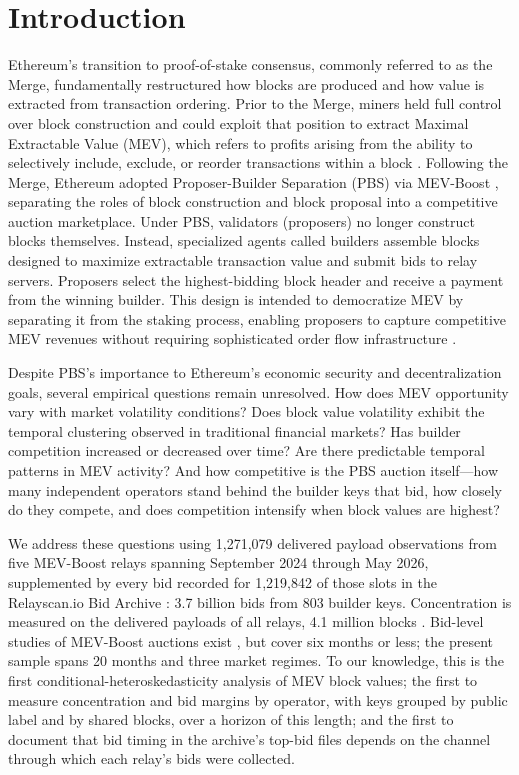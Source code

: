 \documentclass[11pt]{article}
\begin{document}
\newpage
\tableofcontents
\newpage

\section{Introduction}
\label{sec:intro}

Ethereum's transition to proof-of-stake consensus, commonly referred to as the
Merge, fundamentally restructured how blocks are produced and how value is
extracted from transaction ordering. Prior to the Merge, miners held full
control over block construction and could exploit that position to extract
Maximal Extractable Value (MEV), which refers to profits arising from the
ability to selectively include, exclude, or reorder transactions within a block
\citep{daian2020}. Following the Merge, Ethereum adopted Proposer-Builder
Separation (PBS) via MEV-Boost \citep{flashbots2022}, separating the roles of
block construction and block proposal into a competitive auction marketplace.
Under PBS, validators (proposers) no longer construct blocks themselves.
Instead, specialized agents called builders assemble blocks designed to maximize
extractable transaction value and submit bids to relay servers. Proposers select
the highest-bidding block header and receive a payment from the winning builder.
This design is intended to democratize MEV by separating it from the staking
process, enabling proposers to capture competitive MEV revenues without
requiring sophisticated order flow infrastructure \citep{buterin2021}.

Despite PBS's importance to Ethereum's economic security and decentralization
goals, several empirical questions remain unresolved. How does MEV opportunity
vary with market volatility conditions? Does block value volatility exhibit the
temporal clustering observed in traditional financial markets? Has builder
competition increased or decreased over time? Are there predictable temporal
patterns in MEV activity? And how competitive is the PBS auction itself---how
many independent operators stand behind the builder keys that bid, how
closely do they compete, and does competition intensify when block values
are highest?

We address these questions using 1,271,079 delivered payload observations from
five MEV-Boost relays spanning September 2024 through May 2026, supplemented by
every bid recorded for 1,219,842 of those slots in the Relayscan.io Bid
Archive \citep{relayscan2024}: 3.7 billion bids from 803 builder keys.
Concentration is measured on the delivered payloads of all relays, 4.1
million blocks \citep{dataalways2024}.
Bid-level studies of MEV-Boost auctions exist \citep{oz2024,wang2024}, but
cover six months or less; the present sample spans 20 months and three market
regimes. To our knowledge, this is the first conditional-heteroskedasticity
analysis of MEV block values; the first to measure concentration and bid
margins by operator, with keys grouped by public label and by shared blocks, over a horizon
of this length; and the first to document that bid timing in the archive's
top-bid files depends on the channel through which each relay's bids were
collected.
\end{document}
